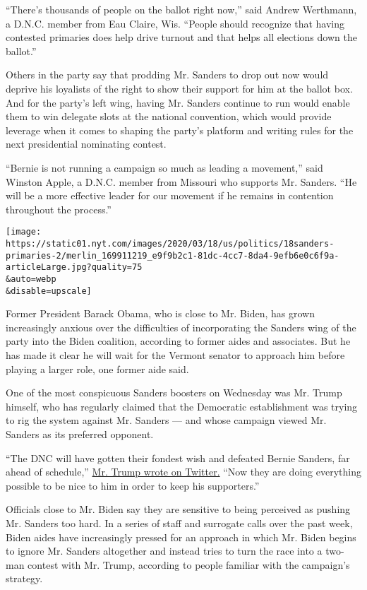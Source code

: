 ``There's thousands of people on the ballot right now,'' said Andrew
Werthmann, a D.N.C. member from Eau Claire, Wis. ``People should
recognize that having contested primaries does help drive turnout and
that helps all elections down the ballot.''

Others in the party say that prodding Mr. Sanders to drop out now would
deprive his loyalists of the right to show their support for him at the
ballot box. And for the party's left wing, having Mr. Sanders continue
to run would enable them to win delegate slots at the national
convention, which would provide leverage when it comes to shaping the
party's platform and writing rules for the next presidential nominating
contest.

``Bernie is not running a campaign so much as leading a movement,'' said
Winston Apple, a D.N.C. member from Missouri who supports Mr. Sanders.
``He will be a more effective leader for our movement if he remains in
contention throughout the process.''

\texttt{[image: https://static01.nyt.com/images/2020/03/18/us/politics/18sanders-primaries-2/merlin\_169911219\_e9f9b2c1-81dc-4cc7-8da4-9efb6e0c6f9a-articleLarge.jpg?quality=75\\\&auto=webp\\\&disable=upscale]}

Former President Barack Obama, who is close to Mr. Biden, has grown
increasingly anxious over the difficulties of incorporating the Sanders
wing of the party into the Biden coalition, according to former aides
and associates. But he has made it clear he will wait for the Vermont
senator to approach him before playing a larger role, one former aide
said.

One of the most conspicuous Sanders boosters on Wednesday was Mr. Trump
himself, who has regularly claimed that the Democratic establishment was
trying to rig the system against Mr. Sanders --- and whose campaign
viewed Mr. Sanders as its preferred opponent.

``The DNC will have gotten their fondest wish and defeated Bernie
Sanders, far ahead of schedule,''
\href{https://twitter.com/realDonaldTrump/status/1240265729108303873}{Mr.
Trump wrote on Twitter.} ``Now they are doing everything possible to be
nice to him in order to keep his supporters.''

Officials close to Mr. Biden say they are sensitive to being perceived
as pushing Mr. Sanders too hard. In a series of staff and surrogate
calls over the past week, Biden aides have increasingly pressed for an
approach in which Mr. Biden begins to ignore Mr. Sanders altogether and
instead tries to turn the race into a two-man contest with Mr. Trump,
according to people familiar with the campaign's strategy.

